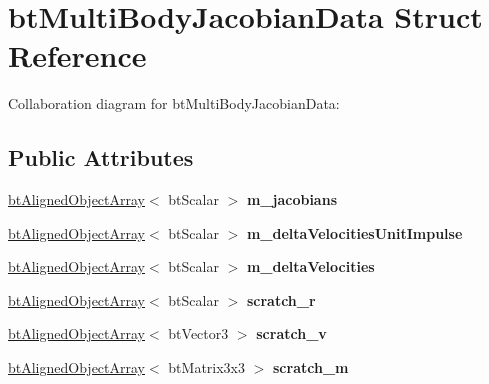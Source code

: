 \hypertarget{structbt_multi_body_jacobian_data}{\section{bt\+Multi\+Body\+Jacobian\+Data Struct Reference}
\label{structbt_multi_body_jacobian_data}
}


Collaboration diagram for bt\+Multi\+Body\+Jacobian\+Data\+:
\subsection*{Public Attributes}
\begin{DoxyCompactItemize}
\item 
\hypertarget{structbt_multi_body_jacobian_data_a72bcc66548cd0e34357a7f25f16c68fd}{\hyperlink{classbt_aligned_object_array}{bt\+Aligned\+Object\+Array}$<$ bt\+Scalar $>$ {\bfseries m\+\_\+jacobians}}\label{structbt_multi_body_jacobian_data_a72bcc66548cd0e34357a7f25f16c68fd}

\item 
\hypertarget{structbt_multi_body_jacobian_data_a1cc92fc02cd8bdbfc7b4c68f913559f3}{\hyperlink{classbt_aligned_object_array}{bt\+Aligned\+Object\+Array}$<$ bt\+Scalar $>$ {\bfseries m\+\_\+delta\+Velocities\+Unit\+Impulse}}\label{structbt_multi_body_jacobian_data_a1cc92fc02cd8bdbfc7b4c68f913559f3}

\item 
\hypertarget{structbt_multi_body_jacobian_data_a22ba13a6593da38add15bbf58cfe21c5}{\hyperlink{classbt_aligned_object_array}{bt\+Aligned\+Object\+Array}$<$ bt\+Scalar $>$ {\bfseries m\+\_\+delta\+Velocities}}\label{structbt_multi_body_jacobian_data_a22ba13a6593da38add15bbf58cfe21c5}

\item 
\hypertarget{structbt_multi_body_jacobian_data_abb5c553e7d77897b69ff7813a5a9243f}{\hyperlink{classbt_aligned_object_array}{bt\+Aligned\+Object\+Array}$<$ bt\+Scalar $>$ {\bfseries scratch\+\_\+r}}\label{structbt_multi_body_jacobian_data_abb5c553e7d77897b69ff7813a5a9243f}

\item 
\hypertarget{structbt_multi_body_jacobian_data_acabb2f8fc3fc86fb8517aecce7c60e46}{\hyperlink{classbt_aligned_object_array}{bt\+Aligned\+Object\+Array}$<$ bt\+Vector3 $>$ {\bfseries scratch\+\_\+v}}\label{structbt_multi_body_jacobian_data_acabb2f8fc3fc86fb8517aecce7c60e46}

\item 
\hypertarget{structbt_multi_body_jacobian_data_abbbaa7d0ef1c941a339663afde2dac5a}{\hyperlink{classbt_aligned_object_array}{bt\+Aligned\+Object\+Array}$<$ bt\+Matrix3x3 $>$ {\bfseries scratch\+\_\+m}}\label{structbt_multi_body_jacobian_data_abbbaa7d0ef1c941a339663afde2dac5a}


\end{DoxyCompactItemize}
